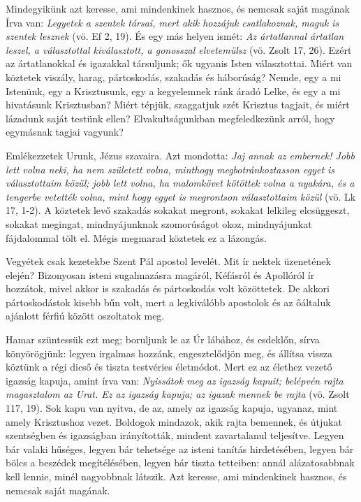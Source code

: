 \documentclass[twoside]{article}
\begin{document}
\begin{lectio}{Mindegyikünk azt keresse, ami mindenkinek hasznos, és nemcsak saját magának}
\noindent Írva van: \textit{Legyetek a szentek társai, mert akik hozzájuk csatlakoznak, maguk is szentek lesznek} (vö. Ef 2, 19). És egy más helyen ismét: \textit{Az ártatlannal ártatlan leszel, a választottal kiválasztott, a gonosszal elvetemülsz} (vö. Zsolt 17, 26). Ezért az ártatlanokkal és igazakkal társuljunk; ők ugyanis Isten választottai. Miért van köztetek viszály, harag, pártoskodás, szakadás és háborúság? Nemde, egy a mi Istenünk, egy a Krisztusunk, egy a kegyelemnek ránk áradó Lelke, és egy a mi hivatásunk Krisztusban? Miért tépjük, szaggatjuk szét Krisztus tagjait, és miért lázadunk saját testünk ellen? Elvakultságunkban megfeledkezünk arról, hogy egymásnak tagjai vagyunk?

Emlékezzetek Urunk, Jézus szavaira. Azt mondotta: \textit{Jaj annak az embernek! Jobb lett volna neki, ha nem született volna, minthogy megbotránkoztasson egyet is választottaim közül; jobb lett volna, ha malomkövet kötöttek volna a nyakára, és a tengerbe vetették volna, mint hogy egyet is megrontson választottaim közül} (vö. Lk 17, 1-2). A köztetek levő szakadás sokakat megront, sokakat lelkileg elcsüggeszt, sokakat megingat, mindnyájunknak szomorúságot okoz, mindnyájunkat fájdalommal tölt el. Mégis megmarad köztetek ez a lázongás.

Vegyétek csak kezetekbe Szent Pál apostol levelét. Mit ír nektek üzenetének elején? Bizonyosan isteni sugalmazásra magáról, Kéfásról és Apollóról ír hozzátok, mivel akkor is szakadás és pártoskodás volt közöttetek. De akkori pártoskodástok kisebb bűn volt, mert a legkiválóbb apostolok és az őáltaluk ajánlott férfiú között oszoltatok meg.

Hamar szüntessük ezt meg; boruljunk le az Úr lábához, és esdeklőn, sírva könyörögjünk: legyen irgalmas hozzánk, engesztelődjön meg, és állítsa vissza köztünk a régi dicső és tiszta testvéries életmódot. Mert ez az élethez vezető igazság kapuja, amint írva van: \textit{Nyissátok meg az igazság kapuit; belépvén rajta magasztalom az Urat. Ez az igazság kapuja; az igazak mennek be rajta} (vö. Zsolt 117, 19). Sok kapu van nyitva, de az, amely az igazság kapuja, ugyanaz, mint amely Krisztushoz vezet. Boldogok mindazok, akik rajta bemennek, és útjukat szentségben és igazságban irányították, mindent zavartalanul teljesítve. Legyen bár valaki hűséges, legyen bár tehetsége az isteni tanítás hirdetésében, legyen bár bölcs a beszédek megítélésében, legyen bár tiszta tetteiben: annál alázatosabbnak kell lennie, minél nagyobbnak látszik. Azt keresse, ami mindenkinek hasznos, és nemcsak saját magának.
\end{lectio}
\end{document}
